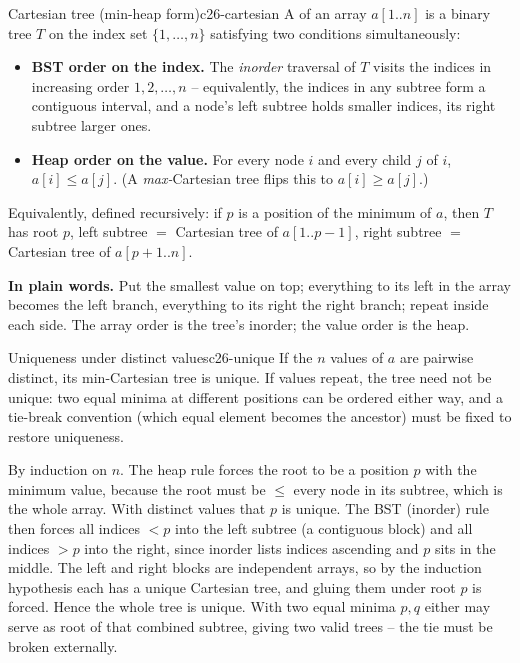 \begin{definition}{Cartesian tree (min-heap form)}{c26-cartesian}
A  of an array $a[1..n]$ is a binary tree $T$ on the index set $\{1,\dots,n\}$
satisfying two conditions simultaneously:
\begin{itemize}[nosep]
  \item \textbf{BST order on the index.} The \emph{inorder} traversal of $T$ visits the indices in
        increasing order $1,2,\dots,n$ -- equivalently, the indices in any subtree form a contiguous
        interval, and a node's left subtree holds smaller indices, its right subtree larger ones.
  \item \textbf{Heap order on the value.} For every node $i$ and every child $j$ of $i$,
        $a[i] \le a[j]$. (A \emph{max-}Cartesian tree flips this to $a[i]\ge a[j]$.)
\end{itemize}
Equivalently, defined recursively: if $p$ is a position of the minimum of $a$, then $T$ has root $p$,
left subtree $=$ Cartesian tree of $a[1..p-1]$, right subtree $=$ Cartesian tree of $a[p+1..n]$.
\end{definition}

\noindent\textbf{In plain words.} Put the smallest value on top; everything to its left in the array
becomes the left branch, everything to its right the right branch; repeat inside each side. The array
order is the tree's inorder; the value order is the heap.

\begin{theorem}{Uniqueness under distinct values}{c26-unique}
If the $n$ values of $a$ are pairwise distinct, its min-Cartesian tree is unique. If values repeat,
the tree need not be unique: two equal minima at different positions can be ordered either way, and a
tie-break convention (which equal element becomes the ancestor) must be fixed to restore uniqueness.
\end{theorem}
\begin{proofbox}
By induction on $n$. The heap rule forces the root to be a position $p$ with the minimum value, because
the root must be $\le$ every node in its subtree, which is the whole array. With distinct values that
$p$ is unique. The BST (inorder) rule then forces all indices $<p$ into the left subtree (a contiguous
block) and all indices $>p$ into the right, since inorder lists indices ascending and $p$ sits in the
middle. The left and right blocks are independent arrays, so by the induction hypothesis each has a
unique Cartesian tree, and gluing them under root $p$ is forced. Hence the whole tree is unique. With
two equal minima $p,q$ either may serve as root of that combined subtree, giving two valid trees -- the
tie must be broken externally.
\end{proofbox}

